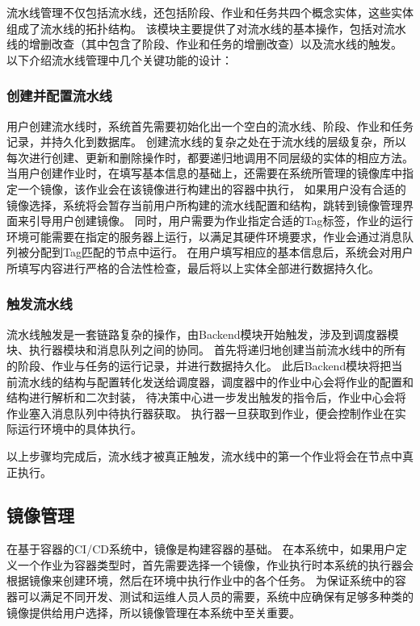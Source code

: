 流水线管理不仅包括流水线，还包括阶段、作业和任务共四个概念实体，这些实体组成了流水线的拓扑结构。
该模块主要提供了对流水线的基本操作，包括对流水线的增删改查（其中包含了阶段、作业和任务的增删改查）以及流水线的触发。
以下介绍流水线管理中几个关键功能的设计：

\subsubsection{创建并配置流水线}
用户创建流水线时，系统首先需要初始化出一个空白的流水线、阶段、作业和任务记录，并持久化到数据库。
创建流水线的复杂之处在于流水线的层级复杂，所以每次进行创建、更新和删除操作时，都要递归地调用不同层级的实体的相应方法。
当用户创建作业时，在填写基本信息的基础上，还需要在系统所管理的镜像库中指定一个镜像，该作业会在该镜像进行构建出的容器中执行，
如果用户没有合适的镜像选择，系统将会暂存当前用户所构建的流水线配置和结构，跳转到镜像管理界面来引导用户创建镜像。
同时，用户需要为作业指定合适的Tag标签，作业的运行环境可能需要在指定的服务器上运行，以满足其硬件环境要求，作业会通过消息队列被分配到Tag匹配的节点中运行。
在用户填写相应的基本信息后，系统会对用户所填写内容进行严格的合法性检查，最后将以上实体全部进行数据持久化。

\subsubsection{触发流水线}
流水线触发是一套链路复杂的操作，由Backend模块开始触发，涉及到调度器模块、执行器模块和消息队列之间的协同。
首先将递归地创建当前流水线中的所有的阶段、作业与任务的运行记录，并进行数据持久化。
此后Backend模块将把当前流水线的结构与配置转化发送给调度器，调度器中的作业中心会将作业的配置和结构进行解析和二次封装，
待决策中心进一步发出触发的指令后，作业中心会将作业塞入消息队列中待执行器获取。
执行器一旦获取到作业，便会控制作业在实际运行环境中的具体执行。

以上步骤均完成后，流水线才被真正触发，流水线中的第一个作业将会在节点中真正执行。

\subsection{镜像管理}
\label{subsec:镜像管理}

在基于容器的CI/CD系统中，镜像是构建容器的基础。
在本系统中，如果用户定义一个作业为容器类型时，首先需要选择一个镜像，作业执行时本系统的执行器会根据镜像来创建环境，然后在环境中执行作业中的各个任务。
为保证系统中的容器可以满足不同开发、测试和运维人员人员的需要，系统中应确保有足够多种类的镜像提供给用户选择，所以镜像管理在本系统中至关重要。

